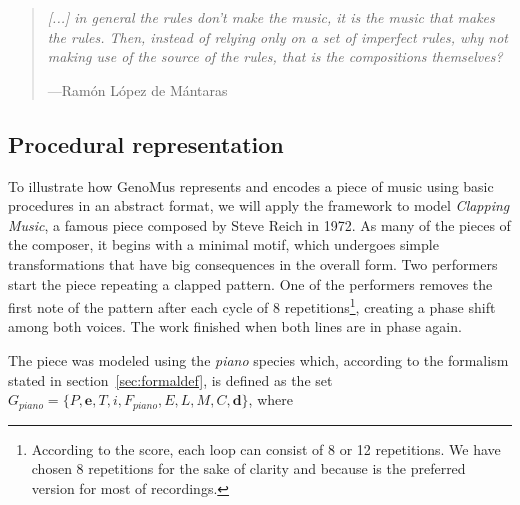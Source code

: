 \documentclass{article}
\renewcommand{\vec}[1]{\mathbf{#1}}
\begin{document}
\begin{samepage}
\begin{quotation}
\textsl{[...] in general the rules don't make the music, it is the music that makes the rules. Then, instead of relying only on a set of imperfect rules, why not making use of the source of the rules, that is the compositions themselves?
}

---Ram\'{o}n L\'{o}pez de M\'{a}ntaras \cite{LopezdeMantaras:2006:MMA:1565082.1565089}
\end{quotation}
\end{samepage}



\subsection{Procedural representation}


To illustrate how GenoMus represents and encodes a piece of music using basic procedures in an abstract format, we will apply the framework to model \emph{Clapping Music}, a famous piece composed by Steve Reich in 1972. As many of the pieces of the composer, it begins with a minimal motif, which undergoes simple transformations that have big consequences in the overall form. Two performers start the piece repeating a clapped pattern. One of the performers removes the first note of the pattern after each cycle of 8 repetitions\footnote{According to the score, each loop can consist of 8 or 12 repetitions. We have chosen 8 repetitions for the sake of clarity and because is the preferred version for most of recordings.}, creating a phase shift among both voices. The work finished when both lines are in phase again.

The piece was modeled using the \emph{piano} species which, according to the formalism stated in section~\ref{sec:formaldef}, is defined as the set $G_{piano} = \{P, \vec{e}, T, i, F_{piano}, E, L, M, C, \vec{d}\}$, where
\end{document}

